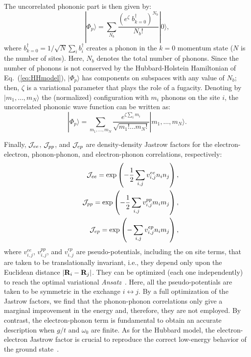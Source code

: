 \documentclass[aps,superscriptaddress,amsmath,amssymb,twocolumn,showpacs,floatfix,english]{revtex4}
\begin{document}
The uncorrelated phononic part is then given by:
\begin{equation}
|\Phi_{p}\rangle = \sum_{N_b} \frac{\left ( e^{\zeta} \; b^\dag_{k=0} \right )^{N_b}}{{N_b}!} |0\rangle, 
\end{equation}
where $b^\dag_{k=0}=1/\sqrt{N}\sum_{i} b^\dag_{i}$ creates a phonon in the $k=0$ momentum state ($N$ is the number of sites). Here, 
$N_b$ denotes the total number of phonons. Since the number of phonons is not conserved by the Hubbard-Holstein Hamiltonian of 
Eq.~(\ref{eq:HHmodel}), $|\Phi_{p}\rangle$ has components on subspaces with any value of $N_b$; then, $\zeta$ is a variational parameter 
that plays the role of a fugacity. Denoting by $|m_{1},\dots,m_{N}\rangle$ the (normalized) configuration with $m_{i}$ phonons on the 
site $i$, the uncorrelated phononic wave function can be written as:
\begin{equation}\label{eq:wfphon}
|\Phi_{p}\rangle = \sum_{m_1,\dots,m_N} \frac{e^{\zeta \sum_{i} m_{i}}}{\sqrt{m_1! \dots m_N!}} |m_{1},\dots,m_{N}\rangle.
\end{equation}

Finally, ${\cal J}_{ee}$, ${\cal J}_{pp}$, and ${\cal J}_{ep}$ are density-density Jastrow factors for the electron-electron,
phonon-phonon, and electron-phonon correlations, respectively:
\begin{eqnarray}
&& {\cal J}_{ee} = \exp \left ( -\frac{1}{2} \sum_{i,j} v^{ee}_{i,j} n_{i} n_{j} \right ), \label{eq:Jee} \\
&& {\cal J}_{pp} = \exp \left ( -\frac{1}{2} \sum_{i,j} v^{pp}_{i,j} m_{i} m_{j} \right ), \label{eq:Jpp} \\
&& {\cal J}_{ep} = \exp \left ( - \sum_{i,j} v^{ep}_{i,j} n_{i} m_{j} \right ), \label{eq:Jep}
\end{eqnarray}
where $v^{ee}_{i,j}$, $v^{pp}_{i,j}$, and $v^{ep}_{i,j}$ are pseudo-potentials, including the on site terms, that are taken to be 
translationally invariant, i.e., they depend only upon the Euclidean distance $|{\bf R}_{i}-{\bf R}_{j}|$. They can be optimized (each one 
independently) to reach the optimal variational {\it Ansatz}~\cite{Sorella2005}. Here, all the pseudo-potentials are taken to be symmetric 
in the exchange $i \leftrightarrow j$. By a full optimization of the Jastrow factors, we find that the phonon-phonon correlations only 
give a marginal improvement in the energy and, therefore, they are not employed. By contrast, the electron-phonon term is fundamental to 
obtain an accurate description when $g/t$ and $\omega_0$ are finite. As for the Hubbard model, the electron-electron Jastrow factor is 
crucial to reproduce the correct low-energy behavior of the ground state~\cite{Capello2005,Capello2006}.
\end{document}

